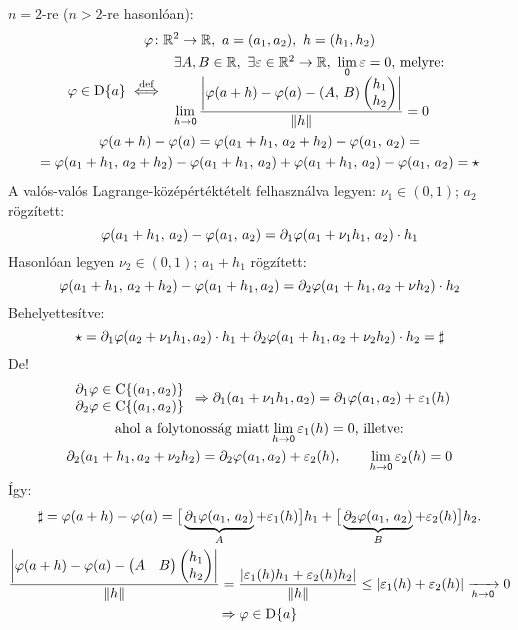 \begin{biz} $n=2$-re ($n>2$-re hasonlóan):
  \begin {gather*}
    \di\vfi\colon \R^2\n\R,\ a=(a_1,a_2),\ h=(h_1,h_2)\\
    \vfi\in\der a \overset{\text{def}}{\ekviv} \begin{array}{l}
      \exists A,B\in\R,\ \exists \epsilon\in\R^2\n\R,\ \di\lim_\nullelem\epsilon=0\text{, melyre:}\\
      \lim\limits_{h\n\nullelem}\dfrac{\left|\vfi(a+h)-\vfi(a)-(A,\,B)\begin{pmatrix}h_1\\h_2\end{pmatrix}\right|}{\norma h}=0
    \end{array}\\
    \vfi(a+h) - \vfi(a) = \vfi(a_1+h_1,\,a_2+h_2) - \vfi(a_1,\,a_2) =\\
    = \vfi(a_1+h_1,\,a_2+h_2) - \vfi(a_1+h_1,\,a_2) +\vfi(a_1+h_1,\,a_2) - \vfi(a_1,\,a_2) = \star
  \end{gather*}
  A valós-valós Lagrange-középértéktételt felhasználva legyen: $\nu_1\in(0,1)$; $a_2$ rögzített:
  \[\varphi(a_1+h_1,\,a_2) - \varphi(a_1,\,a_2) = \partial_1\varphi(a_1+\nu_1h_1,\,a_2)\cdot h_1\]
  Hasonlóan legyen $\nu_2\in(0,1)$; $a_1+h_1$ rögzített:
  \[\varphi(a_1+h_1,\, a_2+h_2) - \varphi (a_1+h_1, a_2) = \partial_2\varphi(a_1+h_1,a_2+\nu h_2)\cdot h_2\]
  Behelyettesítve:
  \[ \star=\partial_1\varphi(a_2+\nu_1h_1,a_2)\cdot h_1 + \partial_2\varphi(a_1+h_1,a_2+\nu_2 h_2)\cdot h_2 = \sharp\]
  De!
  \begin{gather*}\begin{array}{l}\partial_1\varphi \in\operatorname{C}\{(a_1,a_2)\}\\
      \partial_2\varphi \in\operatorname{C}\{(a_1,a_2)\}\end{array} \Rightarrow 
    \partial_1(a_1+\nu_1 h_1, a_2) = \partial_1\varphi(a_1,a_2)+\varepsilon_1(h)\\
    \text{ahol a folytonosság miatt} \lim_{h\to\mathsf{0}}\varepsilon_1(h)=0 \text{, illetve:}\\
    \partial_2(a_1+h_1, a_2+\nu_2 h_2) = \partial_2\varphi(a_1,a_2)+\varepsilon_2(h),\qquad\lim_{h\to\mathsf{0}}\varepsilon_2(h)=0    
  \end{gather*}
  Így:
  \begin{gather*}\sharp = \varphi(a+h)-\varphi(a) = \big[\underbrace{\partial_1\varphi(a_1,\,a_2)}_{A}+\varepsilon_1(h)\big]h_1 + 
    \big[\underbrace{\partial_2\varphi(a_1,\,a_2)}_{B}+\varepsilon_2(h)\big]h_2.\\
    \dfrac{\left|\varphi(a+h) - \varphi(a) - \begin{pmatrix}A & B\end{pmatrix} \begin{pmatrix}h_1\\h_2\end{pmatrix}\right|}
    {\left\Vert h\right\Vert} = \dfrac{\left|\varepsilon_1(h)h_1 + \varepsilon_2(h)h_2\right|}{\left\Vert h\right\Vert} \leq |\varepsilon_1(h) + \varepsilon_2(h)| 
    \xrightarrow[h\to\mathsf{0}]{} 0 \\\Rightarrow \varphi\in\operatorname{D}\{a\}
  \end{gather*}
\end{biz}

